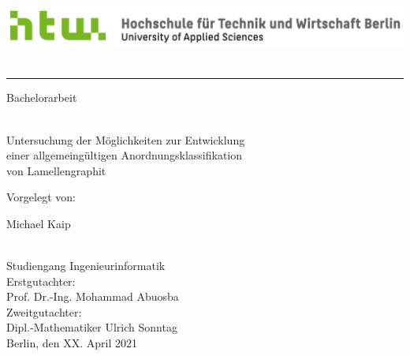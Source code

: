 \documentclass[
fontsize=10pt, 
listof = totoc,
parskip = half	
]{report}
\author{Michael Kaip}
\date{}
\begin{document}
\begin{titlepage}
	\vspace*{-\headsep}\vspace{-\headheight}
	\noindent
	\includegraphics[scale=0.38]{logo}
	\hfill
	\textcolor{white}{placeholder}\\[-1ex]
	\rule{\linewidth}{1pt}
	
	\vfill\vfill
	
	\begin{center}
		Bachelorarbeit
		\begin{huge}
			\\[2ex]
			Untersuchung der Möglichkeiten zur Entwicklung \\ einer allgemeingültigen Anordnungsklassifikation \\ von Lamellengraphit
			\\[6ex]
		\end{huge}
		Vorgelegt von:
		\\[2ex]
		\begin{huge}
			Michael Kaip
		\end{huge}
		\\[2ex]
		Studiengang Ingenieurinformatik
		\\[28ex]
		Erstgutachter:
		\\[2ex]
		Prof. Dr.-Ing. Mohammad Abuosba
		\\[4ex]
		Zweitgutachter:
		\\[2ex]
		Dipl.-Mathematiker Ulrich Sonntag
		\\[40ex]
		Berlin, den XX. April 2021
	\end{center}
\end{titlepage}
	
\clearpage

\begingroup
\pagestyle{empty}
\null
\newpage
\endgroup


\begin{abstract}
	\lipsum[1-4]   
\end{abstract}

\newpage
\tableofcontents
\newpage
{}
\listoffigures
{}
\newpage
\listoftables
{}
\newpage
{}
\newpage
\end{document}
